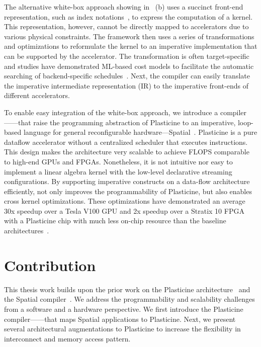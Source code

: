 The alternative white-box approach showing in~ (b) uses a succinct front-end
representation, such as index notations~\cite{taco}, to express the computation of a kernel.
This representation, however, cannot be directly mapped to accelerators due to various physical
constraints.
The framework then uses a series of transformations and optimizations to reformulate the kernel to an imperative implementation that can be supported by the accelerator.
The transformation is often target-specific and studies have demonstrated ML-based cost models to
facilitate the automatic searching of backend-specific schedules~\cite{tvm}.
Next, the compiler can easily translate the imperative intermediate representation (IR) to the imperative front-ends of different
accelerators.

To enable easy integration of the white-box approach, we introduce a compiler---\name---that raise
the programming abstraction of Plasticine to an imperative, loop-based
language for general reconfigurable hardware---Spatial~\cite{spatial}.
Plasticine is a pure dataflow accelerator without a centralized scheduler that
executes instructions. This design makes the architecture very scalable to achieve FLOPS comparable
to high-end GPUs and FPGAs.
Nonetheless, it is not intuitive nor easy to implement a linear algebra kernel with the low-level
declarative streaming configurations.
By supporting imperative constructs on a data-flow architecture efficiently, \name not only improves
the programmability of Plasticine, but also enables cross kernel optimizations.
These optimizations have demonstrated an average 30x speedup over a Tesla V100 GPU and 2x speedup over
a Stratix 10 FPGA with a Plasticine chip with much less on-chip resource than the baseline architectures~\cite{tz_rnn}.

\section{Contribution}

This thesis work builds upon the prior work on the Plasticine architecture~\cite{plasticine} and the Spatial
compiler~\cite{spatial}.
We address the programmability and scalability challenges from a software
and a hardware perspective.
We first introduce the Plasticine compiler---\name---that maps Spatial applications to Plasticine.
Next, we present several architectural augmentations to Plasticine to increase the flexibility in
interconnect and memory access pattern.


